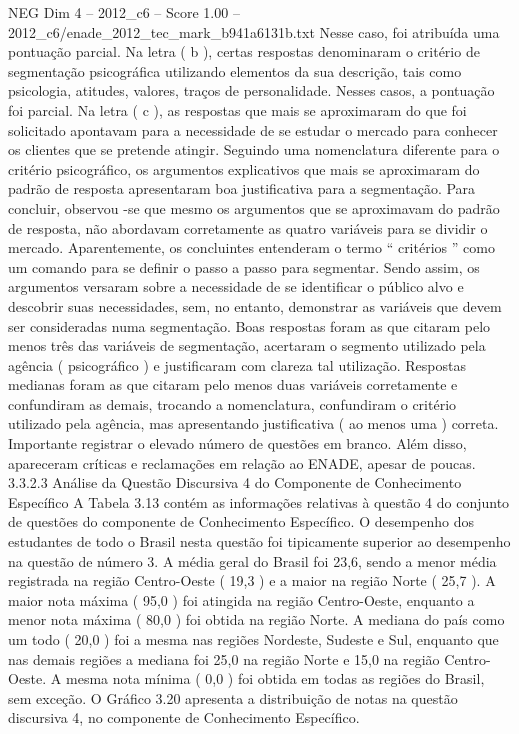 \begin{textsample}{NEG Dim 4 – 2012\_c6 – Score 1.00 – 2012\_c6/enade\_2012\_tec\_mark\_b941a6131b.txt}
Nesse caso, foi atribuída uma pontuação parcial.
Na letra ( b ), certas respostas denominaram o critério de segmentação psicográfica utilizando elementos da sua descrição, tais como psicologia, atitudes, valores, traços de personalidade.
Nesses casos, a pontuação foi parcial.
Na letra ( c ), as respostas que mais se aproximaram do que foi solicitado apontavam para a necessidade de se estudar o mercado para conhecer os clientes que se pretende atingir.
Seguindo uma nomenclatura diferente para o critério psicográfico, os argumentos explicativos que mais se aproximaram do padrão de resposta apresentaram boa justificativa para a segmentação.
Para concluir, observou -se que mesmo os argumentos que se aproximavam do padrão de resposta, não abordavam corretamente as quatro variáveis para se dividir o mercado.
Aparentemente, os concluintes entenderam o termo “ critérios ” como um comando para se definir o passo a passo para segmentar.
Sendo assim, os argumentos versaram sobre a necessidade de se identificar o público alvo e descobrir suas necessidades, sem, no entanto, demonstrar as variáveis que devem ser consideradas numa segmentação.
Boas respostas foram as que citaram pelo menos três das variáveis de segmentação, acertaram o segmento utilizado pela agência ( psicográfico ) e justificaram com clareza tal utilização.
Respostas medianas foram as que citaram pelo menos duas variáveis corretamente e confundiram as demais, trocando a nomenclatura, confundiram o critério utilizado pela agência, mas apresentando justificativa ( ao menos uma ) correta.
Importante registrar o elevado número de questões em branco.
Além disso, apareceram críticas e reclamações em relação ao ENADE, apesar de poucas. 3.3.2.3 Análise da Questão Discursiva 4 do Componente de Conhecimento Específico A Tabela 3.13 contém as informações relativas à questão 4 do conjunto de questões do componente de Conhecimento Específico.
O desempenho dos estudantes de todo o Brasil nesta questão foi tipicamente superior ao desempenho na questão de número 3.
A média geral do Brasil foi 23,6, sendo a menor média registrada na região Centro-Oeste ( 19,3 ) e a maior na região Norte ( 25,7 ).
A maior nota máxima ( 95,0 ) foi atingida na região Centro-Oeste, enquanto a menor nota máxima ( 80,0 ) foi obtida na região Norte.
A mediana do país como um todo ( 20,0 ) foi a mesma nas regiões Nordeste, Sudeste e Sul, enquanto que nas demais regiões a mediana foi 25,0 na região Norte e 15,0 na região Centro-Oeste.
A mesma nota mínima ( 0,0 ) foi obtida em todas as regiões do Brasil, sem exceção.
O Gráfico 3.20 apresenta a distribuição de notas na questão discursiva 4, no componente de Conhecimento Específico.

\end{textsample}
